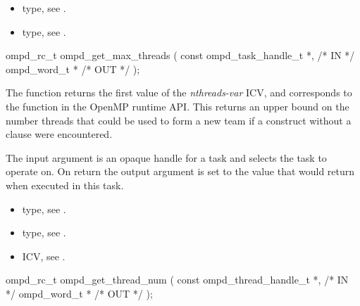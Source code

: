 \crossreferences
\begin{itemize}
	\item {} type, see .
	\item {} type, see .
\end{itemize}


\summary

\format
\cspecificstart
\begin{boxedcode}
ompd\_rc\_t ompd\_get\_max\_threads (
  const ompd\_task\_handle\_t  *,                           /* IN */
  ompd\_word\_t              *                                   /* OUT */
); 
\end{boxedcode}
\cspecificend

\descr
The  function returns the first value of the
 \emph{nthreads-var} ICV,
and corresponds to the  function
in the OpenMP runtime API.
This returns an upper bound on the number threads that could be used
to form a new team if a  construct without a
 clause were encountered.

\argdesc
The input argument  is an opaque handle for a task and selects the task to operate on.
On return the output argument  is set to the value that  would return when
executed in this task.

\crossreferences
\begin{itemize}
	\item {} type, see .
	\item {} type, see .
	\item {} ICV, see .
\end{itemize}

\summary

\format
\cspecificstart
\begin{boxedcode}
ompd\_rc\_t ompd\_get\_thread\_num (
  const ompd\_thread\_handle\_t *,                       /* IN */
  ompd\_word\_t *                                 /* OUT */
);
\end{boxedcode}
\cspecificend

